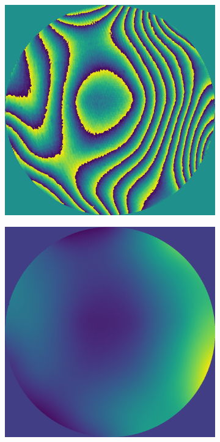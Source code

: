 \begin{figure}
\begin{subfigure}{0.23\textwidth}
		\caption{}
		\label{fig:puw_phaseorder1}
	\end{subfigure}
	\begin{subfigure}{0.23\textwidth}
		\centering
		\includegraphics[width=1\linewidth, scale=0.5]{images/puw_phaseorder1mask}
		\caption{}
		\label{fig:puw_phaseorder1mask}
	\end{subfigure}
	\begin{subfigure}{0.23\textwidth}
		\centering
		\includegraphics[width=1\linewidth, scale=0.5]{images/puw_unwrapped_phase.png}

\end{subfigure}
\end{figure}
